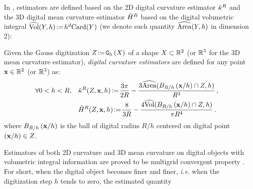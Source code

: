\documentclass{llncs}
\newcommand{\ie}{\emph{i.e.} }
\newcommand{\Jaco}[1]{{\color{orange}#1}}
\begin{document}
In \cite{DGCI2013}, estimators are defined based on the 2D digital curvature estimator
$\hat{\kappa}^{R}$ and the 3D digital mean curvature estimator $\hat{H}^{R}$ based on
the digital volumetric integral $\widehat{\mathrm{Vol}}(Y,h) \!\mathrel{\mathop:}=\! h^d \mathrm{Card}(Y)$ (we denote such
quantity $\widehat{\mathrm{Area}}(Y,h)$ in dimension 2):
%
\begin{Definition}
  Given the Gauss digitization $Z\!\mathrel{\mathop:}=\!\mathtt{G}_{h}\left(X\right)$ of a shape $X \subset {\mathbb{R}}^2$
  (or ${\mathbb{R}}^3$ for the 3D mean curvature estimator), {\em digital curvature
  estimators} are defined for any point $\mathbf{x} \in {\mathbb{R}}^2$ (or ${\mathbb{R}}^3$) as:
  \begin{align}
    \forall 0 < h < R,\quad
    &\hat{\kappa}^{R}(Z,\mathbf{x},h) \!\mathrel{\mathop:}=\! \frac{3\pi}{2R}
    - \frac{3\widehat{\mathrm{Area}}(B_{R/h}\left(\mathbf{x}/h\right) \cap
    {Z}, h)}{R^3}\,,\label{eq:dig-curvature-estimator-k}\\
    &\hat{H}^{R}(Z,\mathbf{x},h) \!\mathrel{\mathop:}=\! \frac{8}{3R}
    - \frac{4\widehat{\mathrm{Vol}}(B_{R/h}\left(\mathbf{x}/h\right) \cap
    Z, h)}{\pi R^4}\,.\label{eq:dig-curvature-estimator-H}
  \end{align}
  where $B_{R/h}\left(\mathbf{x}/h\right)$ is the ball of digital radius $R/h$ centered on
  digital point $(\mathbf{x}/h) \in Z$.
\end{Definition}
%
Estimators of both 2D curvature and 3D mean curvature on digital
objects with volumetric integral information are proved to be multigrid convergent
property \cite{DGCI2013}. For short, when the digital object becomes finer and
finer, \ie when the digitization step $h$ tends to zero, the estimated quantity
\end{document}
